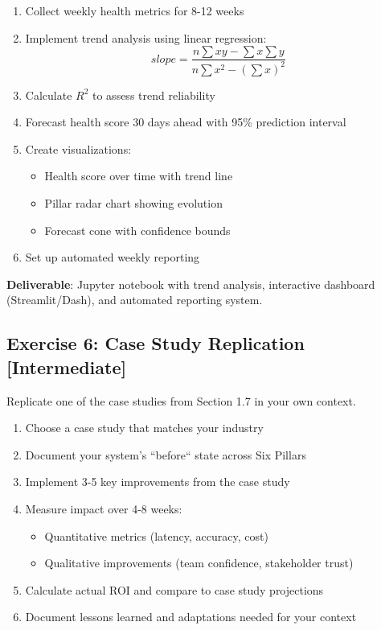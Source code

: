 \begin{enumerate}
    \item Collect weekly health metrics for 8-12 weeks
    \item Implement trend analysis using linear regression:
        \begin{equation*}
        slope = \frac{n\sum xy - \sum x \sum y}{n\sum x^2 - (\sum x)^2}
        \end{equation*}
    \item Calculate $R^2$ to assess trend reliability
    \item Forecast health score 30 days ahead with 95\% prediction interval
    \item Create visualizations:
        \begin{itemize}
            \item Health score over time with trend line
            \item Pillar radar chart showing evolution
            \item Forecast cone with confidence bounds
        \end{itemize}
    \item Set up automated weekly reporting
\end{enumerate}

\textbf{Deliverable}: Jupyter notebook with trend analysis, interactive dashboard (Streamlit/Dash), and automated reporting system.

\subsection{Exercise 6: Case Study Replication [Intermediate]}

Replicate one of the case studies from Section 1.7 in your own context.

\begin{enumerate}
    \item Choose a case study that matches your industry
    \item Document your system's ``before`` state across Six Pillars
    \item Implement 3-5 key improvements from the case study
    \item Measure impact over 4-8 weeks:
        \begin{itemize}
            \item Quantitative metrics (latency, accuracy, cost)
            \item Qualitative improvements (team confidence, stakeholder trust)
        \end{itemize}
    \item Calculate actual ROI and compare to case study projections
    \item Document lessons learned and adaptations needed for your context
\end{enumerate}

